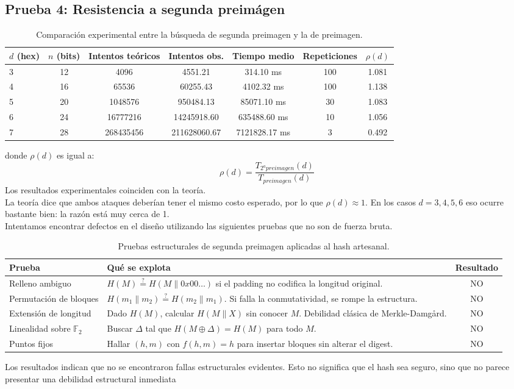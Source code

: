 \documentclass[11pt, letterpaper]{article}
\begin{document}
\subsection{Prueba 4: Resistencia a segunda preimágen}
\begin{table}[H]
\centering
\small
\renewcommand{\arraystretch}{1.2}
\begin{tabular}{lcccccc}
\toprule
$d$ (hex) & $n$ (bits) & Intentos teóricos & Intentos obs. & Tiempo medio & Repeticiones & $\rho(d)$ \\
\midrule
3 & 12 & 4096 & 4551.21 & 314.10 ms & 100 & 1.081 \\
4 & 16 & 65536 & 60255.43 & 4102.32 ms & 100 & 1.138 \\
5 & 20 & 1048576 & 950484.13 & 85071.10 ms & 30 & 1.083 \\
6 & 24 & 16777216 & 14245918.60 & 635488.60 ms & 10 & 1.056 \\
7 & 28 & 268435456 & 211628060.67 & 7121828.17 ms & 3 & 0.492 \\
\bottomrule
\end{tabular}
\caption{Comparación experimental entre la búsqueda de segunda preimagen y la de preimagen.}
\end{table}
donde $\rho(d)$ es igual a:
\begin{equation}
    \rho(d) = \frac{T_{2^a preimagen}(d)}{T_{preimagen}(d)}
\end{equation}
Los resultados experimentales coinciden con la teoría.\\
La teoría dice que ambos ataques deberían tener el mismo costo esperado, por lo que
$\rho(d) \approx 1$. En los casos $d = 3,4,5,6$ eso ocurre bastante bien: la razón está muy cerca de 1.\\

Intentamos encontrar defectos en el diseño utilizando las siguientes pruebas que no son de fuerza bruta. 
\begin{table}[H]
\centering
\small
\renewcommand{\arraystretch}{1.2}
\begin{tabular}{p{4cm} p{5.3cm} c}
\toprule
Prueba & Qué se explota & Resultado \\
\midrule
Relleno ambiguo & $H(M) \stackrel{?}{=} H(M \| 0x00\ldots)$ si el padding no codifica la longitud original. & NO \\
Permutación de bloques & $H(m_1 \| m_2) \stackrel{?}{=} H(m_2 \| m_1)$. Si falla la conmutatividad, se rompe la estructura. & NO \\
Extensión de longitud & Dado $H(M)$, calcular $H(M \| X)$ sin conocer $M$. Debilidad clásica de Merkle-Damgård. & NO \\
Linealidad sobre $\mathbb{F}_2$ & Buscar $\Delta$ tal que $H(M \oplus \Delta) = H(M)$ para todo $M$. & NO \\
Puntos fijos & Hallar $(h,m)$ con $f(h,m)=h$ para insertar bloques sin alterar el digest. & NO \\
\bottomrule
\end{tabular}
\caption{Pruebas estructurales de segunda preimagen aplicadas al hash artesanal.}
\end{table}
Los resultados indican que no se encontraron fallas estructurales evidentes. Esto no significa que el hash sea seguro, sino que no parece presentar una debilidad estructural inmediata
\end{document}
